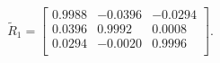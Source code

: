 \begin{equation*}
\widetilde{R}_{1} = 
\begin{bmatrix}
  0.9988 &  -0.0396 &  -0.0294 \\
  0.0396 &   0.9992 &   0.0008 \\
  0.0294 &  -0.0020 &   0.9996 \\
\end{bmatrix}.
\end{equation*}
